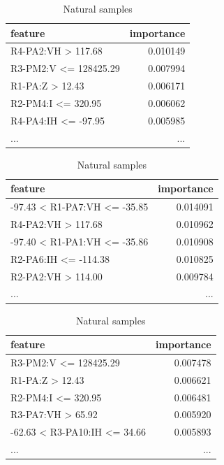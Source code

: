 \begin{table}[H]
    \footnotesize
    \centering
    \caption{5 most important features by class for Random Forest classifier} \label{tab:5best_rf}
    \begin{subtable}[t]{0.5\linewidth}
        \centering
        \caption{NoEvents samples} 
        \begin{tabular}{lr}\toprule
            feature  &importance\\\midrule            
            R4-PA2:VH > 117.68    &   0.010149 \\ 
            R3-PM2:V <= 128425.29  &  0.007994 \\
            R1-PA:Z > 12.43       &   0.006171 \\
            R2-PM4:I <= 320.95     &  0.006062 \\
            R4-PA4:IH <= -97.95   &   0.005985 \\
            ...                                 & ... \\\bottomrule
        \end{tabular}
    \end{subtable}%
    \begin{subtable}[t]{0.5\linewidth}
        \centering
        \caption{Attack samples} 
        \begin{tabular}{lr}\toprule
            feature                   & importance \\\midrule
            -97.43 < R1-PA7:VH <= -35.85  &  0.014091 \\
            R4-PA2:VH > 117.68            &  0.010962 \\
            -97.40 < R1-PA1:VH <= -35.86  &  0.010908 \\
            R2-PA6:IH <= -114.38          &  0.010825 \\
            R2-PA2:VH > 114.00            &  0.009784 \\
            ...                           & ... \\\bottomrule
        \end{tabular}
    \end{subtable}
    \begin{subtable}[b]{0.5\linewidth}
        \centering\vspace*{.5cm}
        \caption{Natural samples} 
        \begin{tabular}{lr}\toprule
            feature                & importance   \\\midrule    
            R3-PM2:V <= 128425.29         &  0.007478 \\
            R1-PA:Z > 12.43               &  0.006621 \\
            R2-PM4:I <= 320.95            &  0.006481 \\
            R3-PA7:VH > 65.92             &  0.005920 \\
            -62.63 < R3-PA10:IH <= 34.66  &  0.005893 \\
            ...                    &       ...    \\\bottomrule
        \end{tabular}
    \end{subtable}
\end{table}

